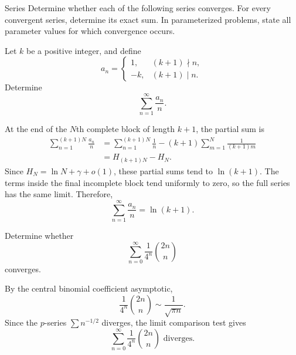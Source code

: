     \begin{expectedproblemgroup}{Series}
        Determine whether each of the following series converges. For every
        convergent series, determine its exact sum. In parameterized problems,
        state all parameter values for which convergence occurs.

        \begin{expectedsubproblem}
            Let $k$ be a positive integer, and define
            \[
                a_n
                =
                \begin{cases}
                    1, & (k+1)\nmid n,\\
                    -k, & (k+1)\mid n.
                \end{cases}
            \]
            Determine
            \[
                \sum_{n=1}^{\infty}\frac{a_n}{n}.
            \]
        \end{expectedsubproblem}

        \begin{expectedsubsolution}
            At the end of the $N$th complete block of length $k+1$, the partial sum
            is
            \[
                \begin{aligned}
                    \sum_{n=1}^{(k+1)N}\frac{a_n}{n}
                    &=
                    \sum_{n=1}^{(k+1)N}\frac{1}{n}
                    -(k+1)\sum_{m=1}^{N}\frac{1}{(k+1)m}\\
                    &=
                    H_{(k+1)N}-H_N.
                \end{aligned}
            \]
            Since $H_N=\ln N+\gamma+o(1)$, these partial sums tend to
            $\ln(k+1)$. The terms inside the final incomplete block tend uniformly
            to zero, so the full series has the same limit. Therefore,
            \[
                \boxed{
                    \sum_{n=1}^{\infty}\frac{a_n}{n}=\ln(k+1)
                }.
            \]
        \end{expectedsubsolution}

        \begin{expectedsubproblem}
            Determine whether
            \[
                \sum_{n=0}^{\infty}
                \frac{1}{4^n}\binom{2n}{n}
            \]
            converges.
        \end{expectedsubproblem}

        \begin{expectedsubsolution}
            By the central binomial coefficient asymptotic,
            \[
                \frac{1}{4^n}\binom{2n}{n}
                \sim
                \frac{1}{\sqrt{\pi n}}.
            \]
            Since the $p$-series $\sum n^{-1/2}$ diverges, the limit comparison
            test gives
            \[
                \boxed{
                    \sum_{n=0}^{\infty}
                    \frac{1}{4^n}\binom{2n}{n}
                    \text{ diverges}
                }.
            \]
        \end{expectedsubsolution}


\end{expectedproblemgroup}

